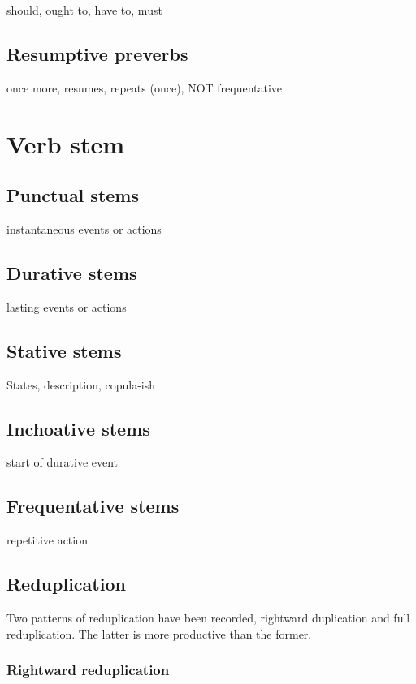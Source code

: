 \documentclass[smallroyalvopaper,9pt]{memoir} %
\begin{document}
should, ought to, have to, must

\subsection{Resumptive preverbs}

once more, resumes, repeats (once), NOT frequentative

\section{Verb stem}

\subsection{Punctual stems}

instantaneous events or actions

\subsection{Durative stems}

lasting events or actions

\subsection{Stative stems}

States, description, copula-ish

\subsection{Inchoative stems}

start of durative event

\subsection{Frequentative stems}

repetitive action

\subsection{Reduplication}

Two patterns of reduplication have been recorded, rightward duplication and full reduplication. The latter is more productive than the former.

\subsubsection{Rightward reduplication}
\end{document}
